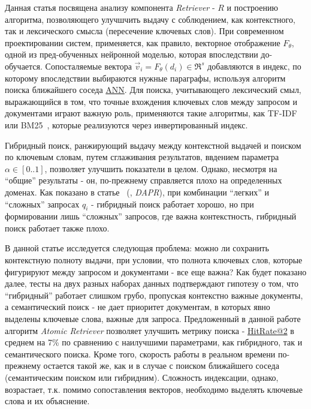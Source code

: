 Данная статья посвящена анализу компонента \emph{Retriever} - $R$ и построению алгоритма, позволяющего улучшчить выдачу с соблюдением, как контекстного, так и лексического смысла (пересечение ключевых слов).
При современном проектировании систем, применяется, как правило, векторное отображение $F_\theta$, одной из пред-обученных нейронной моделью, которая впоследствии до-обучается.
Сопосталяемые вектора $\vec{v}_i=F_\theta(d_i) \in \Re^{s}$ добавляются в индекс,  по которому впоследствии выбираются нужные параграфы, используя алгоритм поиска ближайшего соседа \href{https://en.wikipedia.org/wiki/Nearest_neighbor_search}{ANN}.
Для поиска, учитывающего лексический смыл, выражающийся в том, что точные вхождения ключевых слов между запросом и документами играют важную роль, применяются такие алгоритмы, как
TF-IDF или BM25~\cite{robertson2009probabilistic}, которые реализуются через инвертированный индекс.


Гибридный поиск, ранжирующий выдачу между контекстной выдачей и поиском по ключевым словам, путем сглаживания результатов, ввдением параметра $\alpha \in [0..1]$, позволяет улучшить показатели в целом. Однако,
несмотря на ``общие'' результаты - он, по-прежнему справляется плохо на определенных доменах. Как показано в статье ~(\citet{DAPR}, \textit{DAPR}), при комбинации ``легких'' и ``сложных'' запросах $q_i$ - гибридный поиск работает хорошо, но при 
формировании лишь ``сложных'' запросов, где важна контекстность, гибридный поиск работает также плохо.
%


В данной статье исследуется следующая проблема:  можно ли сохранить контекстную полноту выдачи, при условии, что полнота ключевых слов, которые фигурируют между запросом и документами - все еще важна? Как будет показано далее, 
тесты на двух разных наборах данных подтверждают гипотезу о том, что ``гибридный'' работает слишком грубо, пропуская контекстно важные документы, а семантический поиск - не дает приоритет документам, в которых явно выделены ключевые слова, важные для запроса.
Предложенный в данной работе  алгоритм \emph{Atomic Retriever} позволяет улучшить метрику поиска - \href{https://en.wikipedia.org/wiki/Evaluation_measures_(information_retrieval)}{HitRate@2} в среднем на 7\% по сравнению с наилучшими параметрами, как гибридного, так и семантического поиска.
Кроме того, скорость работы в реальном времени по-прежнему остается такой же, как и в случае с поиском ближайшего соседа (семантическим поиском или гибридним). Сложность индексации, однако, возрастает, т.к. помимо сопоставления векторов, необходимо выделять ключевые слова и их объяснение.
